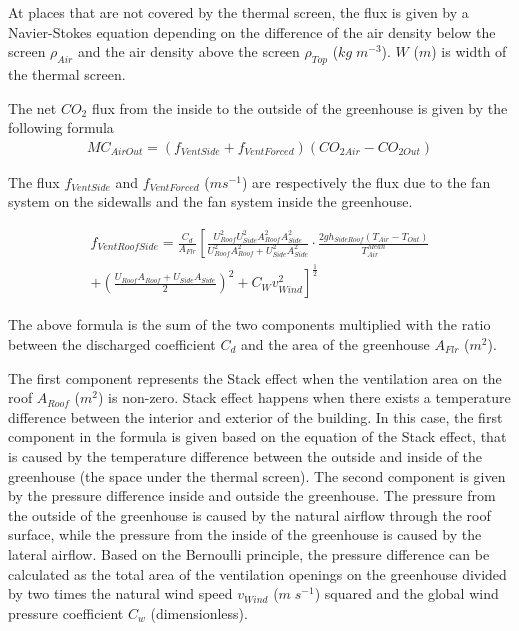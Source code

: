 \documentclass[a4paper]{article}
\begin{document}
At places that are not covered by the thermal screen, the flux is given by a Navier-Stokes equation depending on the difference of the air density below the screen \(\rho_{Air}\) and the air density above the screen \(\rho_{Top}\) (\(kg\;m^{-3}\)). \(W\) (\(m\)) is width of the thermal screen.

The net \(CO_2\) flux from the inside to the outside of the greenhouse is given by the following formula
\begin{align}
  MC_{AirOut} = (f_{VentSide} + f_{VentForced})(CO_{2 Air} - CO_{2 Out})
\end{align}

The flux \(f_{VentSide}\) and \(f_{VentForced}\) (\(m s^{-1}\)) are respectively the flux due to the fan system on the sidewalls and the fan system inside the greenhouse.


\begin{multline}
  \label{eq:vent_roof_side}
  f_{VentRoofSide} = \frac{C_d}{A_{Flr}} \left[\frac{U_{Roof}^2 U_{Side}^2 A_{Roof}^2 A_{Side}^2}{U_{Roof}^2 A_{Roof}^2 + U_{Side}^2 A_{Side}^2} \cdot \frac{2gh_{SideRoof} (T_{Air} - T_{Out})}{T_{Air}^{Mean}}\right. \\
  + \left.{ \left(\frac{U_{Roof} A_{Roof} + U_{Side} A_{Side}}{2}\right)}^2 + C_W v_{Wind}^2\right]^{\frac{1}{2}}
\end{multline}

The above formula is the sum of the two components multiplied with the ratio between the discharged coefficient \(C_d\) and the area of the greenhouse \(A_{Flr}\) (\(m^2\)).

The first component represents the Stack effect when the ventilation area on the roof \(A_{Roof}\) (\(m^2\)) is non-zero. Stack effect happens when there exists a temperature difference between the interior and exterior of the building. In this case, the first component in the formula is given based on the equation of the Stack effect, that is caused by the temperature difference between the outside and inside of the greenhouse (the space under the thermal screen).
The second component is given by the pressure difference inside and outside the greenhouse. The pressure from the outside of the greenhouse is caused by the natural airflow through the roof surface, while the pressure from the inside of the greenhouse is caused by the lateral airflow. Based on the Bernoulli principle, the pressure difference can be calculated as the total area of the ventilation openings on the greenhouse divided by two times the natural wind speed \(v_{Wind}\) (\(m\;s^{-1}\)) squared and the global wind pressure coefficient \(C_w\) (dimensionless).
\end{document}
